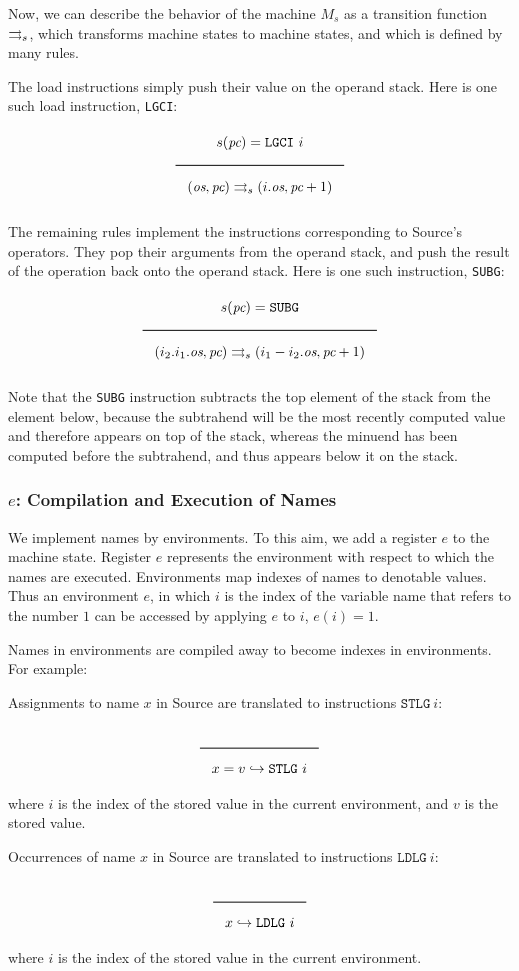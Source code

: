 \begin{appendices}
Now, we can describe the behavior of the machine \(M_s\) as a transition function \(\rightrightarrows_s\), which transforms machine states to machine states, and which is defined by many rules.

The load instructions simply push their value on the operand stack. Here is one such load instruction, \texttt{LGCI}:
$$\Rule{s(\textit{pc}) = \texttt{LGCI}\ i}{
(\textit{os},\textit{pc}) \transition (i.\textit{os},\textit{pc}+1)}$$

The remaining rules implement the instructions corresponding to Source's operators. They pop their arguments from the operand stack, and push the result of the operation back onto the operand stack. Here is one such instruction, \texttt{SUBG}:
$$\Rule{s(\textit{pc}) = \texttt{SUBG}}{
(i_2.i_1.\textit{os},\textit{pc}) \transition (i_1-i_2.\textit{os},\textit{pc}+1)}$$

Note that the \texttt{SUBG} instruction subtracts the top element of the stack from the element below, because the subtrahend will be the most recently computed value and therefore appears on top of the stack, whereas the minuend has been computed before the subtrahend, and thus appears below it on the stack.

\subsubsection{\(\textit{e}\): Compilation and Execution of Names}
\label{sec:org7af6a82}
We implement names by environments. To this aim, we add a register \(e\) to the machine state. Register \(e\) represents the environment with respect to which the names are executed. Environments map indexes of names to denotable values. Thus an environment \(e\), in which \(i\) is the index of the variable name that refers to the number \(1\) can be accessed by applying \(e\) to \(i\), \(e(i) = 1\).

Names in environments are compiled away to become indexes in environments. For example:

Assignments to name \(x\) in Source are translated to instructions \(\texttt{STLG}\ i\):
$$\Rule{}{x = v \translateaux \texttt{STLG}\ i}$$
where \(i\) is the index of the stored value in the current environment, and \(v\) is the stored value.

Occurrences of name \(x\) in Source are translated to instructions \(\texttt{LDLG}\ i\):
$$\Rule{}{x \translateaux \texttt{LDLG}\ i}$$
where \(i\) is the index of the stored value in the current environment.


\end{appendices}
